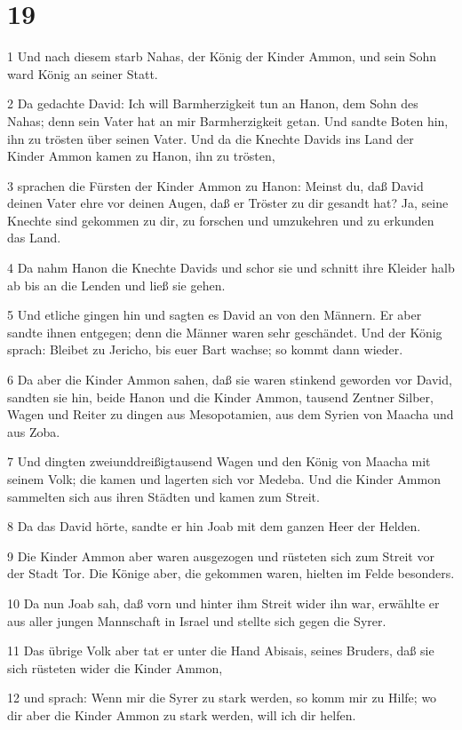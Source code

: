 \chapter{19}

\par 1 Und nach diesem starb Nahas, der König der Kinder Ammon, und sein Sohn ward König an seiner Statt.
\par 2 Da gedachte David: Ich will Barmherzigkeit tun an Hanon, dem Sohn des Nahas; denn sein Vater hat an mir Barmherzigkeit getan. Und sandte Boten hin, ihn zu trösten über seinen Vater. Und da die Knechte Davids ins Land der Kinder Ammon kamen zu Hanon, ihn zu trösten,
\par 3 sprachen die Fürsten der Kinder Ammon zu Hanon: Meinst du, daß David deinen Vater ehre vor deinen Augen, daß er Tröster zu dir gesandt hat? Ja, seine Knechte sind gekommen zu dir, zu forschen und umzukehren und zu erkunden das Land.
\par 4 Da nahm Hanon die Knechte Davids und schor sie und schnitt ihre Kleider halb ab bis an die Lenden und ließ sie gehen.
\par 5 Und etliche gingen hin und sagten es David an von den Männern. Er aber sandte ihnen entgegen; denn die Männer waren sehr geschändet. Und der König sprach: Bleibet zu Jericho, bis euer Bart wachse; so kommt dann wieder.
\par 6 Da aber die Kinder Ammon sahen, daß sie waren stinkend geworden vor David, sandten sie hin, beide Hanon und die Kinder Ammon, tausend Zentner Silber, Wagen und Reiter zu dingen aus Mesopotamien, aus dem Syrien von Maacha und aus Zoba.
\par 7 Und dingten zweiunddreißigtausend Wagen und den König von Maacha mit seinem Volk; die kamen und lagerten sich vor Medeba. Und die Kinder Ammon sammelten sich aus ihren Städten und kamen zum Streit.
\par 8 Da das David hörte, sandte er hin Joab mit dem ganzen Heer der Helden.
\par 9 Die Kinder Ammon aber waren ausgezogen und rüsteten sich zum Streit vor der Stadt Tor. Die Könige aber, die gekommen waren, hielten im Felde besonders.
\par 10 Da nun Joab sah, daß vorn und hinter ihm Streit wider ihn war, erwählte er aus aller jungen Mannschaft in Israel und stellte sich gegen die Syrer.
\par 11 Das übrige Volk aber tat er unter die Hand Abisais, seines Bruders, daß sie sich rüsteten wider die Kinder Ammon,
\par 12 und sprach: Wenn mir die Syrer zu stark werden, so komm mir zu Hilfe; wo dir aber die Kinder Ammon zu stark werden, will ich dir helfen.
